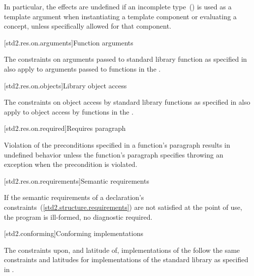 \pnum
In particular, the effects are undefined if an incomplete
type~() is used as a template argument when instantiating a
template component or evaluating a concept, unless specifically allowed for that
component.

[std2.res.on.arguments]{Function arguments}

\pnum
{}%
%
The constraints on arguments passed to \Cpp standard library function as
specified in  also apply to arguments passed to
functions in the .

[std2.res.on.objects]{Library object access}

\pnum
The constraints on object access by \Cpp standard library functions as specified
in  also apply to object access by functions in the
.

[std2.res.on.required]{Requires paragraph}

\pnum
{}%
Violation of the preconditions specified in a function's \requires paragraph
results in undefined behavior unless the function's \throws paragraph specifies
throwing an exception when the precondition is violated.

[std2.res.on.requirements]{Semantic requirements}

\pnum
If the semantic requirements of a declaration's
constraints~(\ref{std2.structure.requirements}) are not satisfied at the point of
use, the program is ill-formed, no diagnostic required.

[std2.conforming]{Conforming implementations}

\pnum
The constraints upon, and latitude of, implementations of the 
follow the same constraints and latitudes for implementations of the \Cpp
standard library as specified in .

